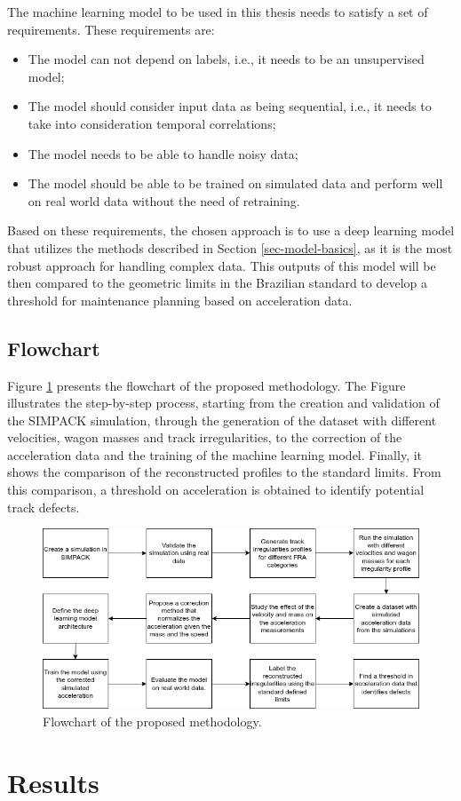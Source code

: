 The machine learning model to be used in this thesis needs to satisfy a set of requirements. These requirements are:
\begin{itemize}
    \item The model can not depend on labels, i.e., it needs to be an unsupervised model;
    \item The model should consider input data as being sequential, i.e., it needs to take into consideration temporal correlations;
    \item The model needs to be able to handle noisy data;
    \item The model should be able to be trained on simulated data and perform well on real world data without the need of retraining.
\end{itemize}

Based on these requirements, the chosen approach is to use a deep learning model that utilizes the methods described in Section \ref{sec-model-basics}, as it is the most robust approach for handling complex data. This outputs of this model will be then compared to the geometric limits in the Brazilian standard to develop a threshold for maintenance planning based on acceleration data.

\section{Flowchart} \label{sec-flowchart}

Figure \ref{fig:flowchart} presents the flowchart of the proposed methodology. The Figure illustrates the step-by-step process, starting from the creation and validation of the SIMPACK simulation, through the generation of the dataset with different velocities, wagon masses and track irregularities, to the correction of the acceleration data and the training of the machine learning model. Finally, it shows the comparison of the reconstructed profiles to the standard limits. From this comparison, a threshold on acceleration is obtained to identify potential track defects.

\begin{figure}[H]
    \centering
    \includegraphics[width=12cm]{Cap3_Methodology/Flowchart/Flowchart.png}
    \caption{Flowchart of the proposed methodology.}
    \label{fig:flowchart}
\end{figure}

\chapter{Results} \label{sec-Results}
